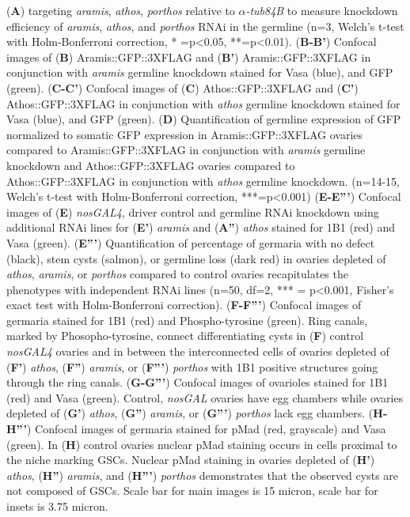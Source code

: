 \documentclass[12pt,oneside]{reedthesis}
\begin{document}
(\textbf{A}) targeting \emph{aramis}, \emph{athos}, \emph{porthos} relative to \(\alpha\)\emph{-tub84B} to
measure knockdown efficiency of \emph{aramis}, \emph{athos}, and \emph{porthos} RNAi in
the germline (n=3, Welch's t-test with Holm-Bonferroni correction, *
=p\textless0.05, **=p\textless0.01). (\textbf{B-B'}) Confocal images of (\textbf{B})
Aramis::GFP::3XFLAG and (\textbf{B'}) Aramis::GFP::3XFLAG in conjunction with
\emph{aramis} germline knockdown stained for Vasa (blue), and GFP (green).
(\textbf{C-C'}) Confocal images of (\textbf{C}) Athos::GFP::3XFLAG and (\textbf{C'})
Athos::GFP::3XFLAG in conjunction with \emph{athos} germline knockdown
stained for Vasa (blue), and GFP (green). (\textbf{D}) Quantification of
germline expression of GFP normalized to somatic GFP expression in
Aramis::GFP::3XFLAG ovaries compared to Aramis::GFP::3XFLAG in
conjunction with \emph{aramis} germline knockdown and Athos::GFP::3XFLAG
ovaries compared to Athos::GFP::3XFLAG in conjunction with \emph{athos}
germline knockdown. (n=14-15, Welch's t-test with Holm-Bonferroni
correction, ***=p\textless0.001) (\textbf{E-E'''}) Confocal images of (\textbf{E})
\emph{nosGAL4}, driver control and germline RNAi knockdown using additional
RNAi lines for (\textbf{E'}) \emph{aramis} and (\textbf{A''}) \emph{athos} stained for 1B1
(red) and Vasa (green). (\textbf{E'''}) Quantification of percentage of
germaria with no defect (black), stem cysts (salmon), or germline loss
(dark red) in ovaries depleted of \emph{athos}, \emph{aramis}, or \emph{porthos}
compared to control ovaries recapitulates the phenotypes with
independent RNAi lines (n=50, df=2, *** = p\textless0.001, Fisher's exact
test with Holm-Bonferroni correction). (\textbf{F-F'''}) Confocal images of
germaria stained for 1B1 (red) and Phospho-tyrosine (green). Ring
canals, marked by Phosopho-tyrosine, connect differentiating cysts in
(\textbf{F}) control \emph{nosGAL4} ovaries and in between the interconnected
cells of ovaries depleted of (\textbf{F'}) \emph{athos}, (\textbf{F''}) \emph{aramis}, or
(\textbf{F'''}) \emph{porthos} with 1B1 positive structures going through the ring
canals. (\textbf{G-G'''}) Confocal images of ovarioles stained for 1B1 (red)
and Vasa (green). Control, \emph{nosGAL} ovaries have egg chambers while
ovaries depleted of (\textbf{G'}) \emph{athos}, (\textbf{G''}) \emph{aramis}, or (\textbf{G'''})
\emph{porthos} lack egg chambers. (\textbf{H-H'''}) Confocal images of germaria
stained for pMad (red, grayscale) and Vasa (green). In (\textbf{H}) control
ovaries nuclear pMad staining occurs in cells proximal to the niche
marking GSCs. Nuclear pMad staining in ovaries depleted of (\textbf{H'})
\emph{athos}, (\textbf{H''}) \emph{aramis}, and (\textbf{H'''}) \emph{porthos} demonstrates that
the observed cysts are not composed of GSCs. Scale bar for main images
is 15 micron, scale bar for insets is 3.75 micron.
\end{document}
